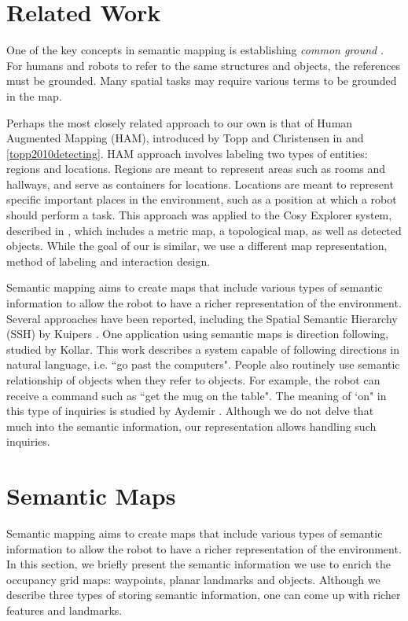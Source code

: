 \section{Related Work}
\label{sec:map_relevant_work}

One of the key concepts in semantic mapping is establishing \textit{common ground} \cite{clark1991grounding}. For humans and robots to refer to the same structures and objects, the references must be grounded. Many spatial tasks may require various terms to be grounded in the map.

Perhaps the most closely related approach to our own is that of Human Augmented Mapping (HAM), introduced by Topp and Christensen in \cite{topp2006topological} and \ref{topp2010detecting}. HAM approach involves labeling two types of entities: regions and locations. Regions are meant to represent areas such as rooms and hallways, and serve as containers for locations. Locations are meant to represent specific important places in the environment, such as a position at which a robot should perform a task. This approach was applied to the Cosy Explorer system, described in \cite{zender2007integrated}, which includes a metric map, a topological map, as well as detected objects. While the goal of our is similar, we use a different map representation, method of labeling and interaction design.

Semantic mapping aims to create maps that include various types of semantic information to allow the robot to have a richer representation of the environment. Several approaches have been reported, including the Spatial Semantic Hierarchy (SSH) by Kuipers \cite{kuipers2000spatial}. One application using semantic maps is direction following, studied by Kollar. This work describes a system capable of following directions in natural language, i.e. ``go past the computers". People also routinely use semantic relationship of objects when they refer to objects. For example, the robot can receive a command such as ``get the mug on the table". The meaning of `on" in this type of inquiries is studied by Aydemir \cite{aydemir2011search}. Although we do not delve that much into the semantic information, our representation allows handling such inquiries.

\section{Semantic Maps}
\label{sec:map_semantic_maps}

Semantic mapping aims to create maps that include various types of semantic information to allow the robot to have a richer representation of the environment. In this section, we briefly present the semantic information we use to enrich the occupancy grid maps: waypoints, planar landmarks and objects. Although we describe three types of storing semantic information, one can come up with richer features and landmarks.


